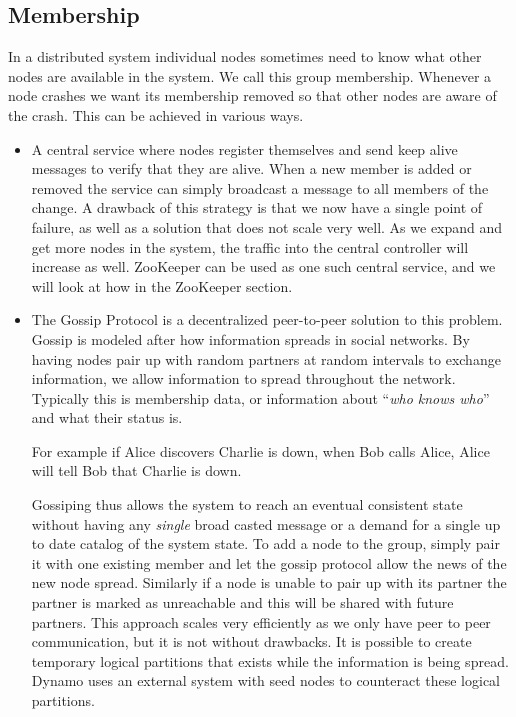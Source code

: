\subsection{Membership}
In a distributed system individual nodes sometimes need to know what other nodes are available in the system. We call this group membership. Whenever a node crashes we want its membership removed so that other nodes are aware of the crash. This can be achieved in various ways. 

\begin{itemize}
\item A central service where nodes register themselves and send keep alive messages to verify that they are alive. When a new member is added or removed the service can simply broadcast a message to all members of the change. A drawback of this strategy is that we now have a single point of failure, as well as a solution that does not scale very well. As we expand and get more nodes in the system, the traffic into the central controller will increase as well. ZooKeeper can be used as one such central service, and we will look at how in the ZooKeeper section.
\item The Gossip Protocol is a decentralized peer-to-peer solution to this problem. Gossip is modeled after how information spreads in social networks. By having nodes pair up with random partners at random intervals to exchange information, we allow information to spread throughout the network. Typically this is membership data, or information about ``\emph{who knows who}'' and what their status is.

For example if Alice discovers Charlie is down, when Bob calls Alice, Alice will tell Bob that Charlie is down.

Gossiping thus allows the system to reach an eventual consistent state without having any \emph{single} broad casted message or a demand for a single up to date catalog of the system state. To add a node to the group, simply pair it with one existing member and let the gossip protocol allow the news of the new node spread. Similarly if a node is unable to pair up with its partner the partner is marked as unreachable and this will be shared with future partners. This approach scales very efficiently as we only have peer to peer communication, but it is not without drawbacks. It is possible to create temporary logical partitions that exists while the information is being spread. Dynamo uses an external system with seed nodes to counteract these logical partitions. 


\end{itemize}
